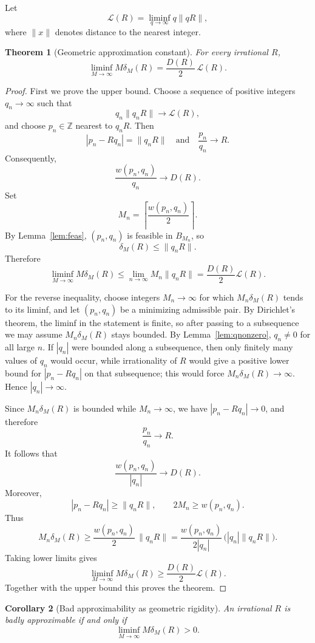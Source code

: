 \documentclass[11pt,a4paper]{article}
\newcommand{\deltam}{\delta_M}
\newtheorem{theorem}{Theorem}[section]
\newtheorem{corollary}[theorem]{Corollary}
\begin{document}
Let
\[
\mathcal L(R)=\liminf_{q\to\infty}q\|qR\|,
\]
where $\|x\|$ denotes distance to the nearest integer.

\begin{theorem}[Geometric approximation constant]\label{thm:lagrange}
For every irrational $R$,
\[
\boxed{
\liminf_{M\to\infty}M\deltam(R)=\frac{D(R)}2\,\mathcal L(R).
}
\]
\end{theorem}

\begin{proof}
First we prove the upper bound. Choose a sequence of positive integers $q_n\to\infty$ such that
\[
q_n\|q_nR\|\to\mathcal L(R),
\]
and choose $p_n\in\mathbb Z$ nearest to $q_nR$. Then
\[
|p_n-Rq_n|=\|q_nR\|
\quad\text{and}\quad
\frac{p_n}{q_n}\to R.
\]
Consequently,
\[
\frac{w(p_n,q_n)}{q_n}\to D(R).
\]
Set
\[
M_n=\left\lceil\frac{w(p_n,q_n)}2\right\rceil.
\]
By Lemma~\ref{lem:feas}, $(p_n,q_n)$ is feasible in $B_{M_n}$, so
\[
\deltam(R)\le\|q_nR\|.
\]
Therefore
\[
\liminf_{M\to\infty}M\deltam(R)
\le
\lim_{n\to\infty}M_n\|q_nR\|
=\frac{D(R)}2\mathcal L(R).
\]

For the reverse inequality, choose integers $M_n\to\infty$ for which
$M_n\deltam(R)$ tends to its liminf, and let $(p_n,q_n)$ be a minimizing admissible pair. By
Dirichlet's theorem, the liminf in the statement is finite, so after passing to a subsequence we
may assume $M_n\deltam(R)$ stays bounded. By Lemma~\ref{lem:qnonzero}, $q_n\ne0$ for all large $n$.
If $|q_n|$ were bounded along a subsequence, then only finitely many values of $q_n$ would occur,
while irrationality of $R$ would give a positive lower bound for $|p_n-Rq_n|$ on that subsequence;
this would force $M_n\deltam(R)\to\infty$. Hence $|q_n|\to\infty$.

Since $M_n\deltam(R)$ is bounded while $M_n\to\infty$, we have
$|p_n-Rq_n|\to0$, and therefore
\[
\frac{p_n}{q_n}\to R.
\]
It follows that
\[
\frac{w(p_n,q_n)}{|q_n|}\to D(R).
\]
Moreover,
\[
|p_n-Rq_n|\ge\|q_nR\|,
\qquad
2M_n\ge w(p_n,q_n).
\]
Thus
\[
M_n\deltam(R)
\ge
\frac{w(p_n,q_n)}2\,\|q_nR\|
=\frac{w(p_n,q_n)}{2|q_n|}\,\bigl(|q_n|\|q_nR\|\bigr).
\]
Taking lower limits gives
\[
\liminf_{M\to\infty}M\deltam(R)
\ge
\frac{D(R)}2\mathcal L(R).
\]
Together with the upper bound this proves the theorem.
\end{proof}

\begin{corollary}[Bad approximability as geometric rigidity]\label{cor:bad}
An irrational $R$ is badly approximable if and only if
\[
\liminf_{M\to\infty}M\deltam(R)>0.
\]
\end{corollary}
\end{document}
